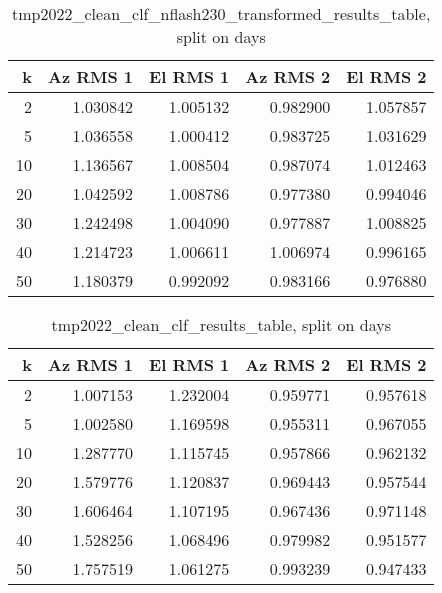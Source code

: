 \begin{table}[h]
    \centering
    \caption{tmp2022_clean_clf_nflash230_transformed_results_table, split on days}
    \begin{tabular}{rrrrr}
        \toprule
         k & Az RMS 1 & El RMS 1 & Az RMS 2 & El RMS 2 \\
        \midrule
         2 &  1.030842 & 1.005132 &  0.982900 &  1.057857 \\
         5 &  1.036558 & 1.000412 &  0.983725 &  1.031629 \\
        10 &  1.136567 & 1.008504 &  0.987074 &  1.012463 \\
        20 &  1.042592 & 1.008786 &  0.977380 &  0.994046 \\
        30 &  1.242498 & 1.004090 &  0.977887 &  1.008825 \\
        40 &  1.214723 & 1.006611 &  1.006974 &  0.996165 \\
        50 &  1.180379 & 0.992092 &  0.983166 &  0.976880 \\
        \bottomrule
    \end{tabular}
\end{table}

\begin{table}[h]
    \centering
    \caption{tmp2022_clean_clf_results_table, split on days}
    \begin{tabular}{rrrrr}
        \toprule
         k & Az RMS 1 & El RMS 1 & Az RMS 2 & El RMS 2 \\
        \midrule
         2 &  1.007153 & 1.232004 &  0.959771 &  0.957618 \\
         5 &  1.002580 & 1.169598 &  0.955311 &  0.967055 \\
        10 &  1.287770 & 1.115745 &  0.957866 &  0.962132 \\
        20 &  1.579776 & 1.120837 &  0.969443 &  0.957544 \\
        30 &  1.606464 & 1.107195 &  0.967436 &  0.971148 \\
        40 &  1.528256 & 1.068496 &  0.979982 &  0.951577 \\
        50 &  1.757519 & 1.061275 &  0.993239 &  0.947433 \\
        \bottomrule
    \end{tabular}
\end{table}

